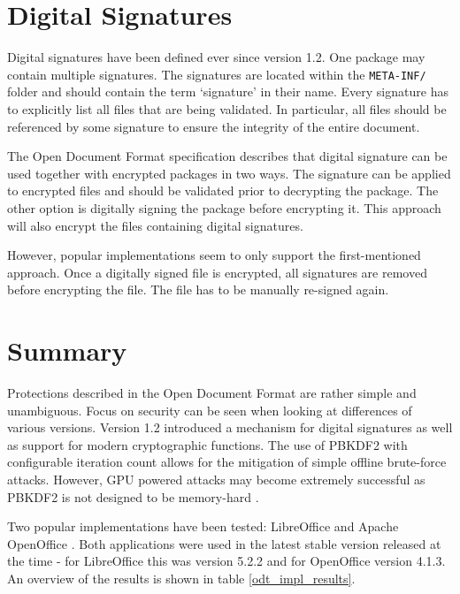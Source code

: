 \documentclass[11pt,oneside]{fithesis2}
\begin{document}
\section{Digital Signatures}

Digital signatures have been defined ever since version 1.2. One package may contain multiple signatures. The signatures are located within the \texttt{META-INF/} folder and should contain the term ‘signature’  in their name. Every signature has to explicitly list all files that are being validated. In particular, all files should be referenced by some signature to ensure the integrity of the entire document.

The Open Document Format specification describes that digital signature can be used together with encrypted packages in two ways. The signature can be applied to encrypted files and should be validated prior to decrypting the package. The other option is digitally signing the package before encrypting it. This approach will also encrypt the files containing digital signatures.  

However, popular implementations seem to only support the first-mentioned approach. Once a digitally signed file is encrypted, all signatures are removed before encrypting the file. The file has to be manually re-signed again.

\section{Summary}

Protections described in the Open Document Format are rather simple and unambiguous. Focus on security can be seen when looking at differences of various versions. Version 1.2 introduced a mechanism for digital signatures as well as support for modern cryptographic functions. The use of PBKDF2 with configurable iteration count allows for the mitigation of simple offline brute-force attacks. However, GPU powered attacks may become extremely successful as PBKDF2 is not designed to be memory-hard \cite{PBKDF2_attack}.

Two popular implementations have been tested: LibreOffice \cite{libreoffice} and Apache OpenOffice \cite{openoffice}. Both applications were used in the latest stable version released at the time - for LibreOffice this was version 5.2.2 and for OpenOffice version 4.1.3. An overview of the results is shown in table \ref{odt_impl_results}.
\end{document}
